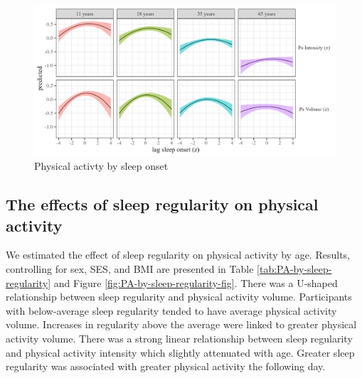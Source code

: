 \documentclass[
  man]{apa6}
\begin{document}
\begin{figure}
\includegraphics[width=7.08in]{../Figures/Pa on sleep_onset_lag} \caption{Physical activty by sleep onset}\label{fig:PA-by-sleep-onset-fig}
\end{figure}

\hypertarget{the-effects-of-sleep-regularity-on-physical-activity}{%
\subsection{The effects of sleep regularity on physical activity}\label{the-effects-of-sleep-regularity-on-physical-activity}}

We estimated the effect of sleep regularity on physical activity by age. Results, controlling for sex, SES, and BMI are presented in Table \ref{tab:PA-by-sleep-regularity} and Figure \ref{fig:PA-by-sleep-regularity-fig}. There was a U-shaped relationship between sleep regularity and physical activity volume. Participants with below-average sleep regularity tended to have average physical activity volume. Increases in regularity above the average were linked to greater physical activity volume. There was a strong linear relationship between sleep regularity and physical activity intensity which slightly attenuated with age. Greater sleep regularity was associated with greater physical activity the following day.
\end{document}
